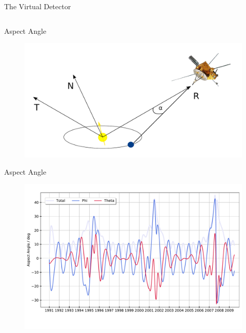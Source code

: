 \documentclass{beamer}
\begin{document}
\begin{frame}{The Virtual Detector}
\begin{columns}
\end{columns}

\end{frame}






\begin{frame}{Aspect Angle}
\begin{figure}
	\includegraphics[scale=0.45]{Pics/RTN_AA_flat_angle.pdf}
\end{figure}
\end{frame}


\begin{frame}{Aspect Angle}
\begin{figure}
	\includegraphics[scale=0.37]{Pics/aa_new.pdf}
\end{figure}
\end{frame}

\end{document}

